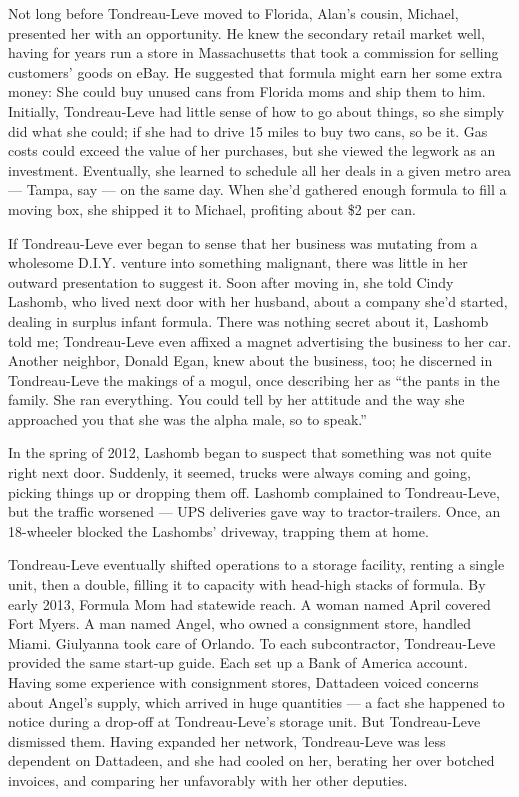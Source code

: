 Not long before Tondreau-Leve moved to Florida, Alan's cousin, Michael,
presented her with an opportunity. He knew the secondary retail market
well, having for years run a store in Massachusetts that took a
commission for selling customers' goods on eBay. He suggested that
formula might earn her some extra money: She could buy unused cans from
Florida moms and ship them to him. Initially, Tondreau-Leve had little
sense of how to go about things, so she simply did what she could; if
she had to drive 15 miles to buy two cans, so be it. Gas costs could
exceed the value of her purchases, but she viewed the legwork as an
investment. Eventually, she learned to schedule all her deals in a given
metro area --- Tampa, say --- on the same day. When she'd gathered
enough formula to fill a moving box, she shipped it to Michael,
profiting about \$2 per can.

If Tondreau-Leve ever began to sense that her business was mutating from
a wholesome D.I.Y. venture into something malignant, there was little in
her outward presentation to suggest it. Soon after moving in, she told
Cindy Lashomb, who lived next door with her husband, about a company
she'd started, dealing in surplus infant formula. There was nothing
secret about it, Lashomb told me; Tondreau-Leve even affixed a magnet
advertising the business to her car. Another neighbor, Donald Egan, knew
about the business, too; he discerned in Tondreau-Leve the makings of a
mogul, once describing her as ``the pants in the family. She ran
everything. You could tell by her attitude and the way she approached
you that she was the alpha male, so to speak.''

In the spring of 2012, Lashomb began to suspect that something was not
quite right next door. Suddenly, it seemed, trucks were always coming
and going, picking things up or dropping them off. Lashomb complained to
Tondreau-Leve, but the traffic worsened --- UPS deliveries gave way to
tractor-trailers. Once, an 18-wheeler blocked the Lashombs' driveway,
trapping them at home.

Tondreau-Leve eventually shifted operations to a storage facility,
renting a single unit, then a double, filling it to capacity with
head-high stacks of formula. By early 2013, Formula Mom had statewide
reach. A woman named April covered Fort Myers. A man named Angel, who
owned a consignment store, handled Miami. Giulyanna took care of
Orlando. To each subcontractor, Tondreau-Leve provided the same start-up
guide. Each set up a Bank of America account. Having some experience
with consignment stores, Dattadeen voiced concerns about Angel's supply,
which arrived in huge quantities --- a fact she happened to notice
during a drop-off at Tondreau-Leve's storage unit. But Tondreau-Leve
dismissed them. Having expanded her network, Tondreau-Leve was less
dependent on Dattadeen, and she had cooled on her, berating her over
botched invoices, and comparing her unfavorably with her other deputies.

